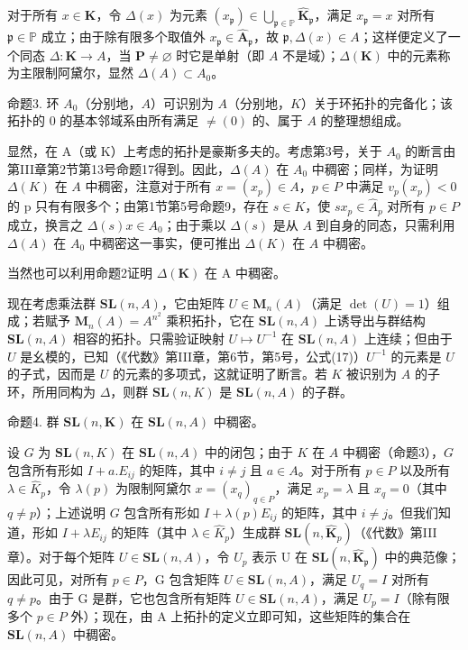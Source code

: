 对于所有 \(x \in \mathbf{K}\)，令 \(\Delta(x)\) 为元素 \((x_{\mathfrak{p}}) \in \bigcup_{\mathfrak{p} \in \mathbb{P}} \hat{\mathbf{K}}_{\mathfrak{p}}\)，满足 \(x_{\mathfrak{p}} = x\) 对所有 \(\mathfrak{p} \in \mathbb{P}\) 成立；由于除有限多个取值外 \(x_{\mathfrak{p}} \in \hat{\mathbf{A}}_{\mathfrak{p}}\)，故 \(\mathfrak{p}, \Delta(x) \in A\)；这样便定义了一个同态 \(\Delta: \mathbf{K} \to A\)，当 \(\mathbf{P} \neq \varnothing\) 时它是单射（即 \(A\) 不是域）；\(\Delta(\mathbf{K})\) 中的元素称为主限制阿黛尔，显然 \(\Delta(A) \subset A_0\)。

命题3. 环 \(A_0\)（分别地，\(A\)）可识别为 \(A\)（分别地，\(K\)）关于环拓扑的完备化；该拓扑的 0 的基本邻域系由所有满足 \(\neq (0)\) 的、属于 \(A\) 的整理想组成。

显然，在 A（或 K）上考虑的拓扑是豪斯多夫的。考虑第3号，关于 \(A_{0}\) 的断言由第III章第2节第13号命题17得到。因此，\(\Delta(A)\) 在 \(A_{0}\) 中稠密；同样，为证明 \(\Delta(K)\) 在 \(A\) 中稠密，注意对于所有 \(x = (x_{p}) \in A\)，\(p \in P\) 中满足 \(v_{p}(x_{p}) < 0\) 的 p 只有有限多个；由第1节第5号命题9，存在 \(s \in K\)，使 \(sx_{p} \in \hat{A}_{p}\) 对所有 \(p \in P\) 成立，换言之 \(\Delta(s)x \in A_{0}\)；由于乘以 \(\Delta(s)\) 是从 \(A\) 到自身的同态，只需利用 \(\Delta(A)\) 在 \(A_{0}\) 中稠密这一事实，便可推出 \(\Delta(K)\) 在 \(A\) 中稠密。

当然也可以利用命题2证明 \(\Delta(\mathbf{K})\) 在 A 中稠密。

现在考虑乘法群 \(\mathbf{SL}(n, A)\)，它由矩阵 \(U \in \mathbf{M}_n(A)\)（满足 \(\det(U) = 1\)）组成；若赋予 \(\mathbf{M}_n(A) = A^{n^2}\) 乘积拓扑，它在 \(\mathbf{SL}(n, A)\) 上诱导出与群结构 \(\mathbf{SL}(n, A)\) 相容的拓扑。只需验证映射 \(U \mapsto U^{-1}\) 在 \(\mathbf{SL}(n, A)\) 上连续；但由于 \(U\) 是幺模的，已知（《代数》第III章，第6节，第5号，公式(17)）\(U^{-1}\) 的元素是 \(U\) 的子式，因而是 \(U\) 的元素的多项式，这就证明了断言。若 \(K\) 被识别为 \(A\) 的子环，所用同构为 \(\Delta\)，则群 \(\mathbf{SL}(n, K)\) 是 \(\mathbf{SL}(n, A)\) 的子群。

命题4. 群 \(\mathbf{SL}(n, \mathbf{K})\) 在 \(\mathbf{SL}(n, A)\) 中稠密。

设 \(G\) 为 \(\mathbf{SL}(n, K)\) 在 \(\mathbf{SL}(n, A)\) 中的闭包；由于 \(K\) 在 \(A\) 中稠密（命题3），\(G\) 包含所有形如 \(I + a.E_{ij}\) 的矩阵，其中 \(i \neq j\) 且 \(a \in A\)。对于所有 \(p \in P\) 以及所有 \(\lambda \in \hat{K}_p\)，令 \(\lambda(p)\) 为限制阿黛尔 \(x = (x_q)_{q \in P}\)，满足 \(x_p = \lambda\) 且 \(x_q = 0\)（其中 \(q \neq p\)）；上述说明 \(G\) 包含所有形如 \(I + \lambda(p)E_{ij}\) 的矩阵，其中 \(i \neq j\)。但我们知道，形如 \(I + \lambda E_{ij}\) 的矩阵（其中 \(\lambda \in \hat{K}_p\)）生成群 \(\mathbf{SL}(n, \hat{\mathbf{K}}_p)\)（《代数》第III章）。对于每个矩阵 \(U \in \mathbf{SL}(n, A)\)，令 \(U_{p}\) 表示 U 在 \(\mathbf{SL}(n, \hat{\mathbf{K}}_{\mathfrak{p}})\) 中的典范像；因此可见，对所有 \(p \in P\)，G 包含矩阵 \(U \in \mathbf{SL}(n, A)\)，满足 \(U_{q} = I\) 对所有 \(q \neq p\)。由于 G 是群，它也包含所有矩阵 \(U \in \mathbf{SL}(n, A)\)，满足 \(U_{p} = I\)（除有限多个 \(p \in P\) 外）；现在，由 A 上拓扑的定义立即可知，这些矩阵的集合在 \(\mathbf{SL}(n, A)\) 中稠密。

